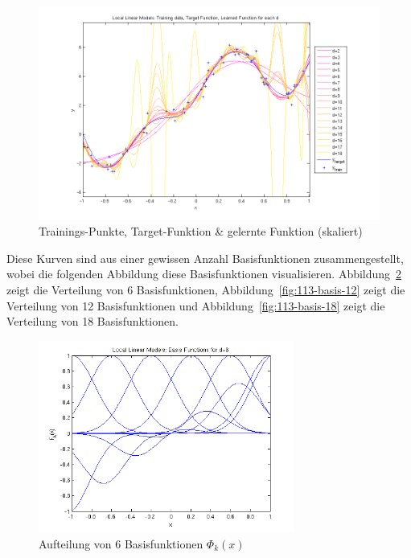 \begin{figure}[h!]
  \centering
  \includegraphics[width=\textwidth]{./figures/1_1_3_curves_in.png}
  \caption{Trainings-Punkte, Target-Funktion \& gelernte Funktion (skaliert)}
  \label{fig:113-curves-in}
\end{figure}

Diese Kurven sind aus einer gewissen Anzahl Basisfunktionen zusammengestellt, wobei die folgenden Abbildung diese Basisfunktionen visualisieren. Abbildung~\ref{fig:113-basis-6} zeigt die Verteilung von 6 Basisfunktionen, Abbildung~\ref{fig:113-basis-12} zeigt die Verteilung von 12 Basisfunktionen und Abbildung~\ref{fig:113-basis-18} zeigt die Verteilung von 18 Basisfunktionen.

\begin{figure}[h!]
  \centering
  \includegraphics[width=0.75\textwidth]{./figures/1_1_3_basis_6.png}
  \caption{Aufteilung von 6 Basisfunktionen $\Phi_k(x)$}
  \label{fig:113-basis-6}
\end{figure}

